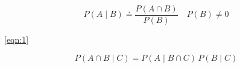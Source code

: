 \begin{equation}
P(A \mid B) \doteq \frac{P(A \cap B)}{P(B)} \quad P(B) \neq 0 \tag{eqn:1}
\end{equation}

\ref{eqn:1}

$$
\boxed{P(A\cap B \mid C)=P(A \mid B\cap C)\,P(B \mid C)}
$$